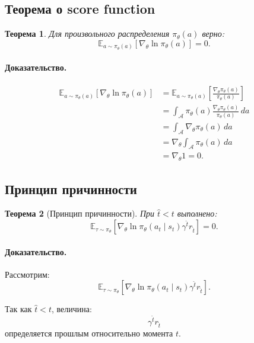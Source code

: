 \documentclass[12pt,a4paper]{article}
\newtheorem{theorem}{Теорема}
\begin{document}
\subsection{Теорема о score function}

\begin{theorem}
Для произвольного распределения $\pi_\theta(a)$ верно:
\[
\mathbb E_{a\sim\pi_\theta(a)}
\left[
\nabla_\theta
\ln \pi_\theta(a)
\right]
=
0.
\]
\end{theorem}

\paragraph{Доказательство.}

\[
\begin{aligned}
\mathbb E_{a\sim\pi_\theta(a)}
\left[
\nabla_\theta
\ln \pi_\theta(a)
\right]
&=
\mathbb E_{a\sim\pi_\theta(a)}
\left[
\frac{
\nabla_\theta\pi_\theta(a)
}{
\pi_\theta(a)
}
\right]
\\
&=
\int_{\mathcal A}
\pi_\theta(a)
\frac{
\nabla_\theta\pi_\theta(a)
}{
\pi_\theta(a)
}
\,da
\\
&=
\int_{\mathcal A}
\nabla_\theta\pi_\theta(a)
\,da
\\
&=
\nabla_\theta
\int_{\mathcal A}
\pi_\theta(a)
\,da
\\
&=
\nabla_\theta 1
=
0.
\end{aligned}
\]

\subsection{Принцип причинности}

\begin{theorem}[Принцип причинности]
При $\hat t<t$ выполнено:
\[
\mathbb E_{\tau\sim\pi_\theta}
\left[
\nabla_\theta
\ln \pi_\theta(a_t\mid s_t)
\gamma^{\hat t}r_{\hat t}
\right]
=
0.
\]
\end{theorem}

\paragraph{Доказательство.}

Рассмотрим:
\[
\mathbb E_{\tau\sim\pi_\theta}
\left[
\nabla_\theta
\ln \pi_\theta(a_t\mid s_t)
\gamma^{\hat t}r_{\hat t}
\right].
\]

Так как $\hat t<t$, величина:
\[
\gamma^{\hat t}r_{\hat t}
\]
определяется прошлым относительно момента $t$.
\end{document}
